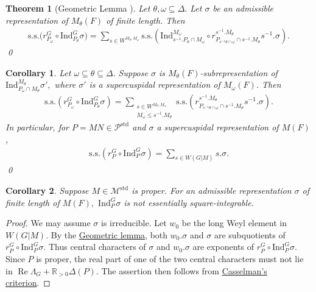 \documentclass[10pt]{amsart}
\newtheorem{theorem}{Theorem}[section]
\newtheorem{corollary}{Corollary}[theorem]
\theoremstyle{definition}
\numberwithin{equation}{section}
\numberwithin{equation}{subsection}
\newcommand{\Ind}{\mathrm{Ind}}
\newcommand{\RR}{\mathbb{R}}
\renewcommand{\Re}{\mathop{\mathrm{Re}}}
\begin{document}
\begin{theorem}[Geometric Lemma {\cite[VI.5.1]{Representation-p-adic}}]\label{geometriclemma:1}
    Let $\theta,\omega\subseteq \Delta.$ Let $\sigma$ be an admissible representation of $M_\theta(F)$ of finite length. Then 
    \begin{align*}
        \mathrm{s.s.}\Big(r^G_{P_\omega}\circ \mathrm{Ind}_{P_\theta}^G \sigma\Big)=\sum_{s\in W^{M_\theta,M_\omega}} \mathrm{s.s.} \left(\mathrm{Ind}^{M_\omega}_{s^{-1}.P_\theta\cap  M_\omega} \circ r^{s^{-1}.M_\theta}_{P_{s^{-1}\theta\cap \omega}\cap s^{-1}.M_{\theta}} s^{-1}.\sigma\right).
    \end{align*}
    \qed    
\end{theorem}


\begin{corollary}\label{geometriclemma:2} Let $\omega\subseteq \theta\subseteq\Delta.$ Suppose $\sigma$ is $M_\theta(F)$-subrepresentation of  $\mathrm{Ind}_{P_\omega\cap M_\theta}^{M_\theta} \sigma',$ where $\sigma'$ is a supercuspidal representation of $M_\omega(F)$. Then
    \begin{align*}
         \mathrm{s.s.}\left(r_{P_\omega}^G \circ \mathrm{Ind}_{P_\theta}^G \sigma\right)=\sum_{\substack{s\in W^{M_\theta,M_\omega}\\ M_\omega\leq s^{-1}.M_\theta}}  \mathrm{s.s.}\left( r^{s^{-1}.M_\theta}_{P_{s^{-1}\theta\cap \omega}\cap s^{-1}.M_\theta}s^{-1}.\sigma\right).
    \end{align*}
    In particular, for $P=MN\in \mathcal{P}^{\mathrm{std}}$ and $\sigma$ a supercuspidal representation of $M(F)$, 
    \begin{align*}
            \mathrm{s.s.}\left(r_P^G \circ \mathrm{Ind}_P^G \sigma\right)=\sum_{s\in W(G|M)} s.\sigma.
    \end{align*}
    \qed

\end{corollary}

\begin{corollary}\label{cor:notfull}
    Suppose $M\in \mathcal{M}^{\mathrm{std}}$ is proper. For an admissible representation $\sigma$ of finite length of $M(F),$ $\Ind_P^G\sigma$ is not essentially square-integrable.
\end{corollary}

\begin{proof}
    We may assume $\sigma$ is irreducible. Let $w_0$ be the long Weyl element in $W(G|M)$. By the \hyperref[geometriclemma:1]{Geometric lemma}, both $w_0.\sigma$ and $\sigma$ are subquotients of $r_P^G\circ \mathrm{Ind}_P^G\sigma$. Thus central characters of $\sigma$ and $w_0.\sigma$ are exponents of $r_P^G\circ \mathrm{Ind}_P^G\sigma.$ Since $P$ is proper, the real part of one of the two central characters must not lie in $\Re\Lambda_G+\RR_{>0}\Delta(P)$. The assertion then follows from \hyperref[CasselmanCriterion]{Casselman's criterion}.
\end{proof}
\end{document}
